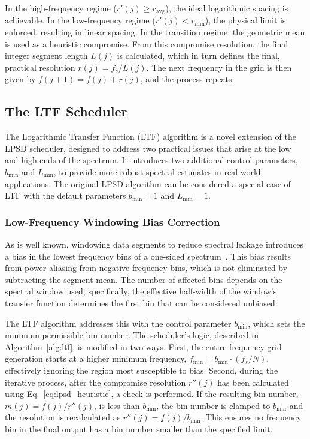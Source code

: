 \documentclass[final, 5p, times, twocolumn, number, sort&compress]{elsarticle}
\begin{document}
In the high-frequency regime ($r'(j) \geq r_{\text{avg}}$), the ideal logarithmic spacing is achievable. In the low-frequency regime ($r'(j) < r_{\min}$), the physical limit is enforced, resulting in linear spacing. In the transition regime, the geometric mean is used as a heuristic compromise. From this compromise resolution, the final integer segment length $L(j)$ is calculated, which in turn defines the final, practical resolution $r(j) = f_s/L(j)$. The next frequency in the grid is then given by $f(j+1) = f(j) + r(j)$, and the process repeats.

\subsection{The LTF Scheduler}
\label{sec:ltf}
The Logarithmic Transfer Function (LTF) algorithm is a novel extension of the LPSD scheduler, designed to address two practical issues that arise at the low and high ends of the spectrum. It introduces two additional control parameters, $b_{\min}$ and $L_{\min}$, to provide more robust spectral estimates in real-world applications. The original LPSD algorithm can be considered a special case of LTF with the default parameters $b_{\min}=1$ and $L_{\min}=1$.

\subsubsection{Low-Frequency Windowing Bias Correction}
As is well known, windowing data segments to reduce spectral leakage introduces a bias in the lowest frequency bins of a one-sided spectrum~\cite{Heinzel2002TN}. This bias results from power aliasing from negative frequency bins, which is not eliminated by subtracting the segment mean. The number of affected bins depends on the spectral window used; specifically, the effective half-width of the window's transfer function determines the first bin that can be considered unbiased.

The LTF algorithm addresses this with the control parameter $b_{\min}$, which sets the minimum permissible bin number. The scheduler's logic, described in Algorithm~\ref{alg:ltf}, is modified in two ways. First, the entire frequency grid generation starts at a higher minimum frequency, $f_{\min} = b_{\min} \cdot (f_s/N)$, effectively ignoring the region most susceptible to bias. Second, during the iterative process, after the compromise resolution $r''(j)$ has been calculated using Eq.~\ref{eq:lpsd_heuristic}, a check is performed. If the resulting bin number, $m(j) = f(j)/r''(j)$, is less than $b_{\min}$, the bin number is clamped to $b_{\min}$ and the resolution is recalculated as $r''(j) = f(j)/b_{\min}$. This ensures no frequency bin in the final output has a bin number smaller than the specified limit.
\end{document}
